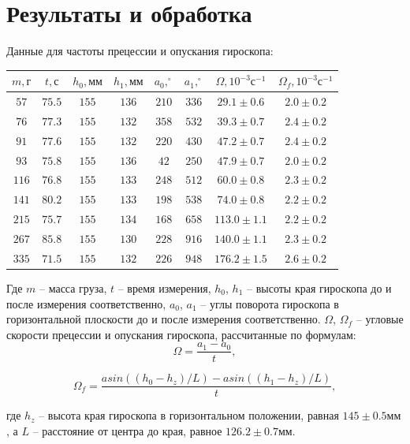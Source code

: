 \documentclass[a4paper,12pt]{article}
\begin{document}
\section*{Результаты и обработка}
Данные для частоты прецессии и опускания гироскопа:
\begin{center}
\begin{tabular}{|c|c|c|c|c|c|c|c|}
\hline
$m, \text{г}$ & $t, \text{с}$ & $h_0, \text{мм}$ & $h_1, \text{мм}$ & $a_0, ^\circ$ & $a_1, ^\circ$ & $\Omega, 10^{-3}\text{с}^{-1}$ & $\Omega_f, 10^{-3}\text{с}^{-1}$\\
\hline
$57$ & $75.5$ & $155$ & $136$ & $210$ & $336$ & $29.1\pm 0.6$ & $2.0\pm 0.2$ \\
\hline
$76$ & $77.3$ & $155$ & $132$ & $358$ & $532$ & $39.3\pm 0.7$ & $2.4\pm 0.2$ \\
\hline
$91$ & $77.6$ & $155$ & $132$ & $220$ & $430$ & $47.2\pm 0.7$ & $2.4\pm 0.2$ \\
\hline
$93$ & $75.8$ & $155$ & $136$ & $42$ & $250$ & $47.9\pm 0.7$ & $2.0\pm 0.2$ \\
\hline
$116$ & $76.8$ & $155$ & $133$ & $248$ & $512$ & $60.0\pm 0.8$ & $2.3\pm 0.2$ \\
\hline
$141$ & $80.2$ & $155$ & $133$ & $198$ & $538$ & $74.0\pm 0.8$ & $2.2\pm 0.2$ \\
\hline
$215$ & $75.7$ & $155$ & $134$ & $168$ & $658$ & $113.0\pm 1.1$ & $2.2\pm 0.2$ \\
\hline
$267$ & $85.8$ & $155$ & $130$ & $228$ & $916$ & $140.0\pm 1.1$ & $2.3\pm 0.2$ \\
\hline
$335$ & $71.5$ & $155$ & $132$ & $226$ & $948$ & $176.2\pm 1.5$ & $2.6\pm 0.2$ \\
\hline
\end{tabular}
\end{center}
Где $m$ -- масса груза, $t$ -- время измерения, $h_0$, $h_1$ -- высоты края гироскопа до и после измерения соответственно, $a_0$, $a_1$ -- углы поворота гироскопа в горизонтальной плоскости до и после измерения соответственно. $\Omega$, $\Omega_f$ -- угловые скорости прецессии и опускания гироскопа, рассчитанные по формулам:
\begin{equation}
	\Omega = \frac{a_1 - a_0}{t},
\end{equation}

\begin{equation}
	\Omega_f = \frac{asin((h_0 - h_z) / L) - asin((h_1 - h_z) / L)}{t},
\end{equation}

где $h_z$ -- высота края гироскопа в горизонтальном положении, равная $145\pm 0.5 \text{мм}$, а $L$ -- расстояние от центра до края, равное $126.2\pm 0.7 \text{мм}$.
\end{document}
